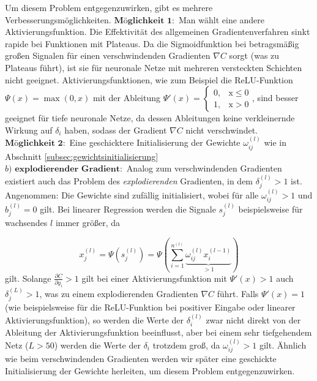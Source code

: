 Um diesem Problem entgegenzuwirken, gibt es mehrere Verbesserungsmöglichkeiten.\newline
$\textbf{Möglichkeit 1}:$ Man wählt eine andere Aktivierungsfunktion. Die Effektivität des allgemeinen
Gradientenverfahren sinkt rapide bei Funktionen mit Plateaus. Da die Sigmoidfunktion bei betragsmäßig großen Signalen
für einen verschwindenden Gradienten $\nabla C$ sorgt (was zu Plateaus führt), ist sie für neuronale Netze mit mehreren
versteckten Schichten nicht geeignet. Aktivierungsfunktionen, wie zum Beispiel die ReLU-Funktion $\Psi(x)=\max(0,x)$ mit
der Ableitung $\Psi'(x)= \begin {cases} 0, &\text{x}\leq 0\\ 1, &\text{x}>0\end{cases}$, sind besser geeignet für tiefe neuronale
Netze, da dessen Ableitungen keine verkleinernde Wirkung auf $\delta_i$ haben, sodass der Gradient $\nabla C$ nicht
verschwindet.\\
$\textbf{Möglichkeit 2}:$ Eine geschicktere Initialisierung der Gewichte $\omega_{ij}^{(l)}$ wie in Abschnitt
\ref{subsec:gewichtsinitialisierung}\\
$b)$ $\textbf{explodierender Gradient}:$
Analog zum verschwindenden Gradienten existiert auch das Problem des \textit{explodierenden} Gradienten, in dem
$\delta_j^{(l)}>1$ ist.\\
Angenommen: Die Gewichte sind zufällig initialisiert, wobei für alle $\omega_{ij}^{(l)}>1$ und $b_j^{(l)}=0$
gilt. Bei linearer Regression werden die Signale $s_j^{(l)}$  beispielsweise für wachsendes $l$ immer größer, da

\[
    x_j^{(l)}=\Psi(s_j^{(l)})=\Psi\left( \sum\limits_{i=1}^{n^{(l)}} \underbrace{\omega_{ij}^{(l)}x_{i}^{(l-1)}}_{>1} \right)
\]
gilt. Solange $\frac{\partial C}{\partial y_i} > 1$ gilt bei einer Aktivierungsfunktion mit $\Psi'(x)>1$ auch $\delta_j^{(L)}>1$,
was zu einem explodierenden Gradienten $\nabla C$ führt. Falls $\Psi'(x)=1$ (wie beispielsweise für die ReLU-Funktion bei
positiver Eingabe oder linearer Aktivierungsfunktion), so werden die Werte der $\delta_i^{(l)}$ zwar nicht direkt von der Ableitung
der Aktivierungsfunktion beeinflusst, aber bei einem sehr tiefgehendem Netz ($L>50$) werden die Werte der $\delta_i$ trotzdem
groß, da $\omega_{ij}^{(l)}>1$ gilt. Ähnlich wie beim verschwindenden Gradienten werden wir später eine geschickte
Initialisierung der Gewichte herleiten, um diesem Problem entgegenzuwirken.

